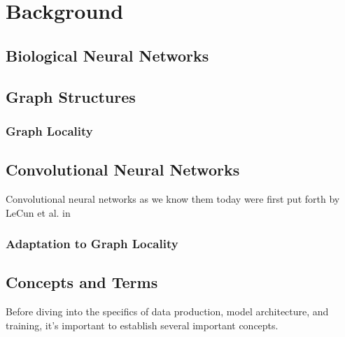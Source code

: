 
\chapter{Background}

\section{Biological Neural Networks}

\section{Graph Structures}

\subsection{Graph Locality}

\section{Convolutional Neural Networks}
Convolutional neural networks as we know them today were first put forth by 
LeCun et al. in 

\subsection{Adaptation to Graph Locality}


\section{Concepts and Terms}
Before diving into the specifics of data production, model architecture, and 
training, it's important to establish several important concepts.

